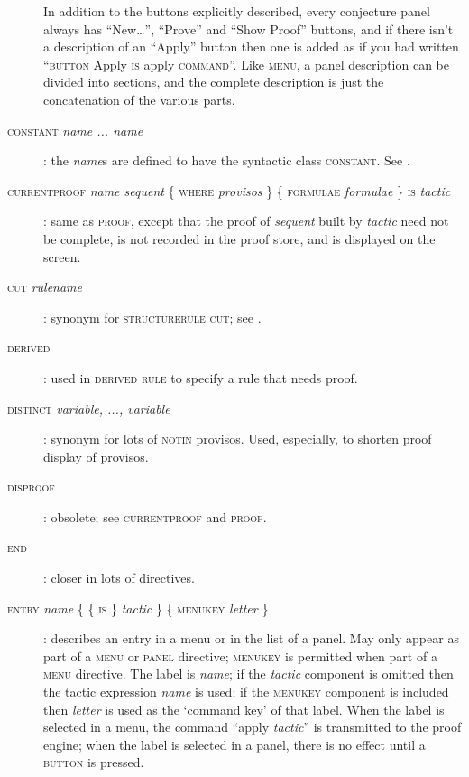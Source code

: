 \begin{description}
In addition to the buttons explicitly described, every conjecture panel always has ``New\dots'', ``Prove'' and ``Show Proof'' buttons, and if there isn't a description of an ``Apply'' button then one is added as if you had written ``\textsc{button} Apply \textsc{is} apply \textsc{command}''. Like \textsc{menu}, a panel description can be divided into sections, and the complete description is just the concatenation of the various parts.

\item[\textsc{constant} \textit{name ... name}]: the \textit{name}s are defined to have the syntactic class \textsc{constant}. See .

\item[\textsc{currentproof} \textit{name sequent} \{ \textsc{where} \textit{provisos} \} \{ \textsc{formulae} \textit{formulae} \} \textsc{is} \textit{tactic}]: same as \textsc{proof}, except that the proof of \textit{sequent} built by \textit{tactic} need not be complete, is not recorded in the proof store, and is displayed on the screen.

\item[\textsc{cut} \textit{rulename}]: synonym for \textsc{structurerule} \textsc{cut}; see .

\item[\textsc{derived}]: used in \textsc{derived rule} to specify a rule that needs proof.

\item[\textsc{distinct} \textit{variable, ..., variable}]: synonym for lots of \textsc{notin} provisos. Used, especially, to shorten proof display of provisos.

\item[\textsc{disproof}]: obsolete; see \textsc{currentproof} and \textsc{proof}.

\item[\textsc{end}]: closer in lots of directives.

\item[\textsc{entry} \textit{name} \{ \{ \textsc{is} \} \textit{tactic} \} \{ \textsc{menukey} \textit{letter} \}]: describes an entry in a menu or in the list of a panel. May only appear as part of a \textsc{menu} or \textsc{panel} directive; \textsc{menukey} is permitted when part of a \textsc{menu} directive. The label is \textit{name}; if the \textit{tactic} component is omitted then the tactic expression \textit{name} is used; if the \textsc{menukey} component is included then \textit{letter} is used as the `command key' of that label. When the label is selected in a menu, the command ``apply \textit{tactic}'' is transmitted to the proof engine; when the label is selected in a panel, there is no effect until a \textsc{button} is pressed.


\end{description}
